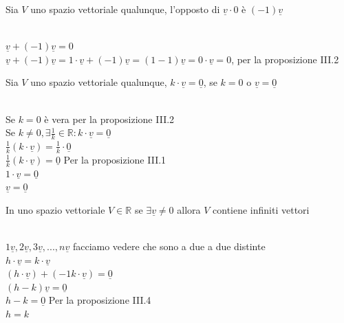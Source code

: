 \begin{proposizione}
	Sia $V$ uno spazio vettoriale qualunque, l'opposto di $\underline{v}\cdot0$ è $(-1)\underline{v}$\\
	\begin{dimostrazione}
		\phantom{}\\
		$\underline{v}+(-1)\underline{v}=0$\\
		$\underline{v}+(-1)\underline{v}=1\cdot \underline{v}+(-1)\underline{v}=(1-1)\underline{v}=0\cdot \underline{v}=0$, per la proposizione III.2
	\end{dimostrazione}
\end{proposizione}
\newpage
\begin{proposizione}
	Sia $V$ uno spazio vettoriale qualunque, $k\cdot \underline{v}=\underline{0}$, se $k=0$ o $\underline{v}=\underline{0}$\\
	\begin{dimostrazione}
		\phantom{}\\
		Se $k=0$ è vera per la proposizione III.2\\
		Se $k\neq0, \exists \frac{1}{k}\in\mathbb{R}: k\cdot \underline{v}=\underline{0}$\\
		$\frac{1}{k}(k\cdot \underline{v})=\frac{1}{k}\cdot \underline{0}$\\
		$\frac{1}{k}(k\cdot \underline{v})=\underline{0}$ Per la proposizione III.1\\
		$1\cdot \underline{v}=\underline{0}$\\
		$\underline{v}=\underline{0}$
	\end{dimostrazione}
\end{proposizione}

\begin{proposizione}
	In uno spazio vettoriale $V\in\mathbb{R}$ se $\exists \underline{v}\neq 0$ allora $V$ contiene infiniti vettori\\
	\begin{dimostrazione}
		\phantom{}\\
		$1\underline{v}, 2\underline{v}, 3\underline{v},..., n\underline{v}$ facciamo vedere che sono a due a due distinte\\
		$h\cdot \underline{v}=k\cdot \underline{v}$\\
		$(h\cdot \underline{v})+(-1k\cdot \underline{v})=\underline{0}$\\
		$(h-k)\underline{v}=\underline{0}$\\
		$h-k=\underline{0}$ Per la proposizione III.4\\
		$h=k$
	\end{dimostrazione}
\end{proposizione}

